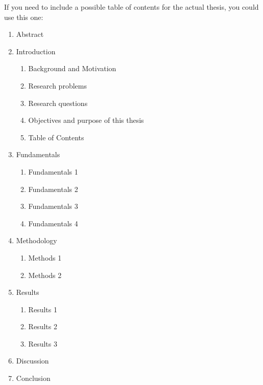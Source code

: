 
If you need to include a possible table of contents for the actual thesis, you could use this one:

\begin{enumerate}
    \item Abstract
    \item Introduction
        \begin{enumerate}
            \item Background and Motivation
            \item Research problems
            \item Research questions
            \item Objectives and purpose of this thesis
            \item Table of Contents
        \end{enumerate}
    \item Fundamentals
        \begin{enumerate}
            \item Fundamentals 1
            \item Fundamentals 2
            \item Fundamentals 3
            \item Fundamentals 4
        \end{enumerate}
    \item Methodology
        \begin{enumerate}
            \item Methods 1 
            \item Methods 2
        \end{enumerate}
    \item Results
        \begin{enumerate}
            \item Results 1
            \item Results 2 
            \item Results 3
        \end{enumerate}
    \item Discussion
    \item Conclusion
\end{enumerate}

\newpage